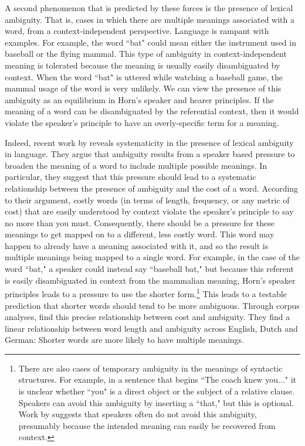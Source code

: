 \documentclass[man, noapacite, 12pt]{apa2}
\begin{document}
A second phenomenon that is predicted by these forces is the presence of lexical ambiguity. That is, cases in which there are multiple meanings associated with a word, from a context-independent perspective. Language is rampant with examples. For example, the word ``bat" could mean either the instrument used in baseball or the flying mammal. This type of ambiguity in context-independent meaning is tolerated because the meaning is usually easily disambiguated by context. When the word ``bat" is uttered while watching a baseball game,  the mammal usage of the word is very unlikely. We can view the presence of this ambiguity as an equilibrium in Horn's speaker and hearer principles. If the meaning of a word can be disambiguated by the referential context, then it would violate the speaker's principle to have an overly-specific term for a meaning. 

Indeed, recent work by  reveals systematicity in the presence of lexical ambiguity in language. They argue that ambiguity results from a speaker based pressure to broaden the meaning of a word to include multiple possible meanings. In particular, they suggest that this pressure should lead to a systematic relationship between the presence of ambiguity and the cost of a word. According to their argument, costly words (in terms of length, frequency, or any metric of cost) that are easily understood by context violate the speaker's principle to say no more than you must. Consequently, there should be a pressure for these meanings to get mapped on to a different, less costly word. This word may happen to already have a meaning associated with it, and so the result  is multiple meanings being mapped to a single word. For example, in the case of the word ``bat," a speaker could instead say ``baseball bat," but because this referent is easily disambiguated in context from the mammalian meaning,  Horn's speaker principles leads to a pressure to use the shorter form.\footnote{There are also cases of temporary ambiguity in the meanings of syntactic structures. For example, in a sentence that begins ``The coach knew you..." it is unclear whether ``you" is a direct object or the subject of a relative clause. Speakers can avoid this ambiguity by inserting a ``that," but this is optional. Work by  suggests that speakers often do not avoid this ambiguity, presumably because the intended meaning can easily be recovered from context.} This leads to a testable prediction that shorter words should tend to be more ambiguous.  Through corpus analyses,  find this precise  relationship between cost and ambiguity. They find a linear relationship between word length and ambiguity across English, Dutch and German: Shorter words are more likely to have multiple meanings. 
\end{document}

